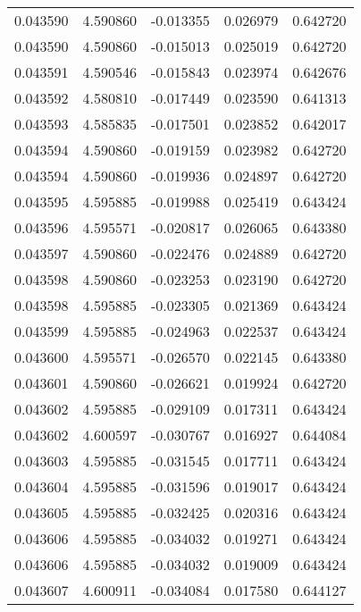 \begin{tabular}{lrrrr}
0.043590    &  4.590860 & -0.013355 &  0.026979 &             0.642720 \\
0.043590    &  4.590860 & -0.015013 &  0.025019 &             0.642720 \\
0.043591    &  4.590546 & -0.015843 &  0.023974 &             0.642676 \\
0.043592    &  4.580810 & -0.017449 &  0.023590 &             0.641313 \\
0.043593    &  4.585835 & -0.017501 &  0.023852 &             0.642017 \\
0.043594    &  4.590860 & -0.019159 &  0.023982 &             0.642720 \\
0.043594    &  4.590860 & -0.019936 &  0.024897 &             0.642720 \\
0.043595    &  4.595885 & -0.019988 &  0.025419 &             0.643424 \\
0.043596    &  4.595571 & -0.020817 &  0.026065 &             0.643380 \\
0.043597    &  4.590860 & -0.022476 &  0.024889 &             0.642720 \\
0.043598    &  4.590860 & -0.023253 &  0.023190 &             0.642720 \\
0.043598    &  4.595885 & -0.023305 &  0.021369 &             0.643424 \\
0.043599    &  4.595885 & -0.024963 &  0.022537 &             0.643424 \\
0.043600    &  4.595571 & -0.026570 &  0.022145 &             0.643380 \\
0.043601    &  4.590860 & -0.026621 &  0.019924 &             0.642720 \\
0.043602    &  4.595885 & -0.029109 &  0.017311 &             0.643424 \\
0.043602    &  4.600597 & -0.030767 &  0.016927 &             0.644084 \\
0.043603    &  4.595885 & -0.031545 &  0.017711 &             0.643424 \\
0.043604    &  4.595885 & -0.031596 &  0.019017 &             0.643424 \\
0.043605    &  4.595885 & -0.032425 &  0.020316 &             0.643424 \\
0.043606    &  4.595885 & -0.034032 &  0.019271 &             0.643424 \\
0.043606    &  4.595885 & -0.034032 &  0.019009 &             0.643424 \\
0.043607    &  4.600911 & -0.034084 &  0.017580 &             0.644127 \\

\end{tabular}
